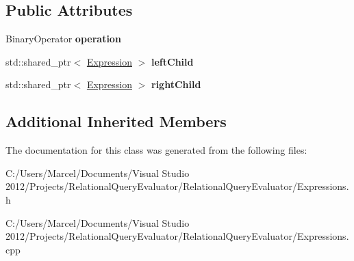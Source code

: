 \subsection*{Public Attributes}
\begin{DoxyCompactItemize}
\item 
\hypertarget{class_binary_expression_ac3926bbcc2ed7bb00eca10b4d4e590d2}{Binary\+Operator {\bfseries operation}}\label{class_binary_expression_ac3926bbcc2ed7bb00eca10b4d4e590d2}

\item 
\hypertarget{class_binary_expression_a2388939b40f93649cfd3c531b181025e}{std\+::shared\+\_\+ptr$<$ \hyperlink{class_expression}{Expression} $>$ {\bfseries left\+Child}}\label{class_binary_expression_a2388939b40f93649cfd3c531b181025e}

\item 
\hypertarget{class_binary_expression_a97803d6333b2fbe6098491136a1445af}{std\+::shared\+\_\+ptr$<$ \hyperlink{class_expression}{Expression} $>$ {\bfseries right\+Child}}\label{class_binary_expression_a97803d6333b2fbe6098491136a1445af}

\end{DoxyCompactItemize}
\subsection*{Additional Inherited Members}


The documentation for this class was generated from the following files\+:\begin{DoxyCompactItemize}
\item 
C\+:/\+Users/\+Marcel/\+Documents/\+Visual Studio 2012/\+Projects/\+Relational\+Query\+Evaluator/\+Relational\+Query\+Evaluator/Expressions.\+h\item 
C\+:/\+Users/\+Marcel/\+Documents/\+Visual Studio 2012/\+Projects/\+Relational\+Query\+Evaluator/\+Relational\+Query\+Evaluator/Expressions.\+cpp\end{DoxyCompactItemize}

